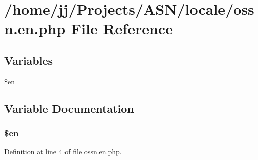 \hypertarget{locale_2ossn_8en_8php}{}\section{/home/jj/\+Projects/\+A\+S\+N/locale/ossn.en.\+php File Reference}
\label{locale_2ossn_8en_8php}
\subsection*{Variables}
\begin{DoxyCompactItemize}
\item 
\hyperlink{locale_2ossn_8en_8php_a48abc714dfb71c8fffa83cf49f452115}{\$en}
\end{DoxyCompactItemize}


\subsection{Variable Documentation}
\subsubsection[{\texorpdfstring{\$en}{$en}}]{\setlength{\rightskip}{0pt plus 5cm}\$en}\hypertarget{locale_2ossn_8en_8php_a48abc714dfb71c8fffa83cf49f452115}{}\label{locale_2ossn_8en_8php_a48abc714dfb71c8fffa83cf49f452115}


Definition at line 4 of file ossn.\+en.\+php.

